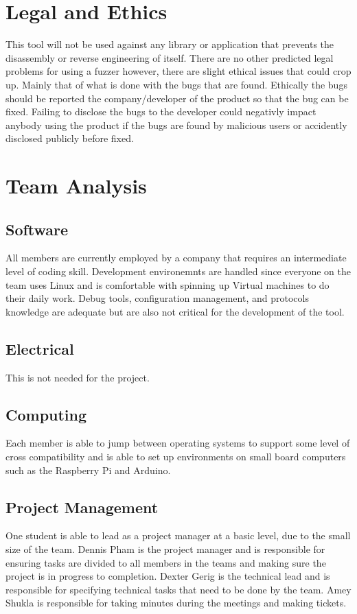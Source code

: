 \documentclass[12pt, a4paper]{article}
\begin{document}
\pagebreak
\section{Legal and Ethics}
This tool will not be used against any library or application that prevents the disassembly or reverse engineering of itself. There are no other predicted legal problems for using a fuzzer however, there are slight ethical issues that could crop up. Mainly that of what is done with the bugs that are found. Ethically the bugs should be reported the company/developer of the product so that the bug can be fixed. Failing to disclose the bugs to the developer could negativly impact anybody using the product if the bugs are found by malicious users or accidently disclosed publicly before fixed.

\section{Team Analysis}
\subsection{Software}
All members are currently employed by a company that requires an intermediate level of coding skill. Development
environemnts are handled since everyone on the team uses Linux and is comfortable with spinning up Virtual machines to
do their daily work. Debug tools, configuration management, and protocols knowledge are adequate but are also not
critical for the development of the tool.

\subsection{Electrical}
This is not needed for the project.

\subsection{Computing}
Each member is able to jump between operating systems to support some level of cross compatibility and is able to set up
environments on small board computers such as the Raspberry Pi and Arduino.

\subsection{Project Management}
One student is able to lead as a project manager at a basic level, due to the small size of the team. Dennis Pham is the project manager and is responsible for ensuring tasks are divided to all members in the teams and making sure the project is in progress to completion. Dexter Gerig is the technical lead and is responsible for specifying technical tasks that need to be done by the team. Amey Shukla is responsible for taking minutes during the meetings and making tickets.
\end{document}
